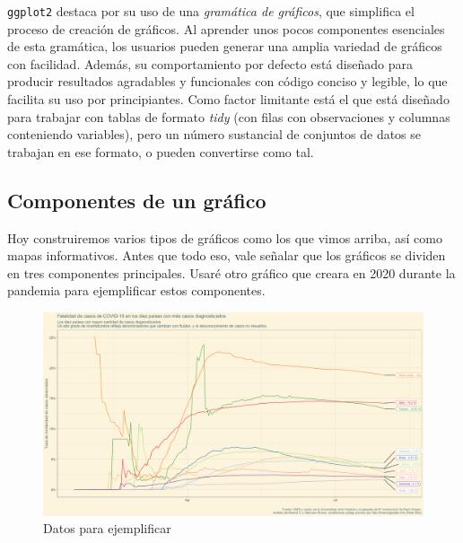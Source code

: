 \documentclass[
]{article}
\begin{document}
\texttt{ggplot2} destaca por su uso de una \emph{gramática de gráficos},
que simplifica el proceso de creación de gráficos. Al aprender unos
pocos componentes esenciales de esta gramática, los usuarios pueden
generar una amplia variedad de gráficos con facilidad. Además, su
comportamiento por defecto está diseñado para producir resultados
agradables y funcionales con código conciso y legible, lo que facilita
su uso por principiantes. Como factor limitante está el que está
diseñado para trabajar con tablas de formato \emph{tidy} (con filas con
observaciones y columnas conteniendo variables), pero un número
sustancial de conjuntos de datos se trabajan en ese formato, o pueden
convertirse como tal.

\subsection{Componentes de un
gráfico}\label{componentes-de-un-gruxe1fico}

Hoy construiremos varios tipos de gráficos como los que vimos arriba,
así como mapas informativos. Antes que todo eso, vale señalar que los
gráficos se dividen en tres componentes principales. Usaré otro gráfico
que creara en 2020 durante la pandemia para ejemplificar estos
componentes.

\begin{figure}
\centering
\includegraphics{Covid.png}
\caption{Datos para ejemplificar}
\end{figure}
\end{document}
